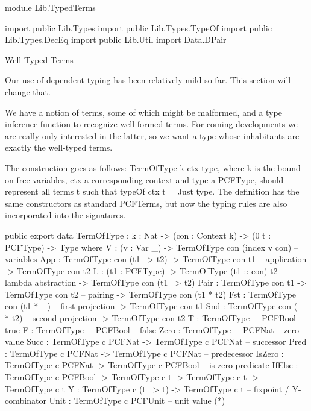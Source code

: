 \begin{hidden}
module Lib.TypedTerms

import public Lib.Types
import public Lib.Types.TypeOf
import public Lib.Types.DecEq
import public Lib.Util
import Data.DPair


\end{hidden}

Well-Typed Terms
-------------

Our use of dependent typing has been relatively mild so far.
This section will change that.

We have a notion of terms, some of which might be malformed, and a type inference function to 
recognize well-formed terms.
For coming developments we are really only interested in the latter, so we want a type whose inhabitants
are exactly the well-typed terms.

The construction goes as follows: TermOfType k ctx type, where k is the bound on free variables, ctx a corresponding context
and type a PCFType, should represent all terms t such that typeOf ctx t = Just type.
The definition has the same constructors as standard PCFTerms, but now the typing rules are also incorporated into the
signatures.

\begin{code}
public export
data TermOfType : {k : Nat} -> (con : Context k) -> (0 t : PCFType) -> Type where
    V    : (v : Var _)  -> TermOfType con (index v con)           -- variables
    App  : TermOfType con (t1 ~> t2)  -> TermOfType con t1            -- application
            -> TermOfType con t2  
    L    : (t1 : PCFType)         -> TermOfType (t1 :: con) t2    -- lambda abstraction
            -> TermOfType con (t1 ~> t2)   
    Pair : TermOfType con t1 -> TermOfType con t2                     -- pairing
            -> TermOfType con (t1 * t2)
    Fst   : TermOfType con (t1 * _)                                -- first projection
            -> TermOfType con t1
    Snd   : TermOfType con (_ * t2)                                -- second projection
            -> TermOfType con t2
    T    : TermOfType _ PCFBool                                   -- true
    F    : TermOfType _ PCFBool                                   -- false
    Zero : TermOfType _ PCFNat                                    -- zero value
    Succ : TermOfType c PCFNat -> TermOfType c PCFNat                 -- successor
    Pred : TermOfType c PCFNat -> TermOfType c PCFNat                 -- predecessor
    IsZero : TermOfType c PCFNat -> TermOfType c PCFBool              -- is zero predicate
    IfElse : TermOfType c PCFBool 
                    -> TermOfType c t
                    -> TermOfType c t
                  -> TermOfType c t
    Y     : TermOfType c (t ~> t) -> TermOfType c t             -- fixpoint / Y-combinator
    Unit  : TermOfType c PCFUnit                            -- unit value (*)
\end{code}

